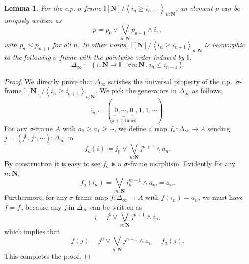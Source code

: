 \documentclass[a4paper,12pt]{amsart}
\newtheorem{lemma}[theorem]{Lemma}
\theoremstyle{definition}
\newcommand{\mb}[1]{\mathbf{#1}}
\newcommand{\mbb}[1]{\mathbb{#1}}
\newcommand{\I}{\mbb I}
\newcommand{\pair}[1]{\left\langle#1\right\rangle}
\newcommand{\scomp}[2]{\{\,#1\mid#2\,\}}
\newcommand{\N}{\mb N}
\newcommand{\fa}[2]{\forall #1\!\colon\!\!#2\mathpunct{.}}
\begin{document}
\begin{lemma}\label{app:normalsigma}
  For the c.p. $\sigma$-frame $\I[\N]/\pair{i_n \ge i_{n+1}}_{n:\N}$, an element $p$ can be uniquely written as 
  \[ p = p_0 \vee \bigvee_{n:\N} p_{n+1} \wedge i_n, \]
  with $p_n \le p_{n+1}$ for all $n$. In other words, $\I[\N]/\pair{i_n \ge i_{n+1}}_{n:\N}$ is isomorphic to the following $\sigma$-frame with the pointwise order induced by $\I$,
  \[ \Delta_\infty \coloneq \scomp{i : \N \to \I}{\fa n\N i_n \le i_{n+1}}. \]
\end{lemma}
\begin{proof}
  We directly prove that $\Delta_\infty$ satisfies the universal property of the c.p.\ $\sigma$-frame $\I[\N]/\pair{i_n \ge i_{n+1}}_{n:\N}$. We pick the generators in $\Delta_\infty$ as follows,
  \[ i_n \coloneq (\underbrace{0,\cdots,0}_{n+1 \text{ times}},1,1,\cdots). \]
  For any $\sigma$-frame $A$ with $a_0 \ge a_1 \ge \cdots$, we define a map $f_a : \Delta_\infty \to A$ sending $j = (j^0,j^1,\cdots) : \Delta_\infty$ to
  \[ f_a(i) \coloneq j_0 \vee \bigvee_{n:\N} j^{n+1} \wedge a_{n}. \]
  By construction it is easy to see $f_a$ is a $\sigma$-frame morphism. Evidently for any $n : \N$, 
  \[ f_a(i_n) = \bigvee_{m:\N} i_n^{m+1} \wedge a_m = a_n. \]
  Furthermore, for any $\sigma$-frame map $f \colon \Delta_\infty \to A$ with $f(i_n) = a_n$, we must have $f = f_a$ because any $j$ in $\Delta_\infty$ can be written as
  \[ j = j^0 \vee \bigvee_{n:\N} j^{n+1} \wedge i_n, \]
  which implies that
  \[ f(j) = j^0 \vee \bigvee_{n:\N}j^{n+1} \wedge a_n = f_a(j). \]
  This completes the proof.
\end{proof}

\end{document}
